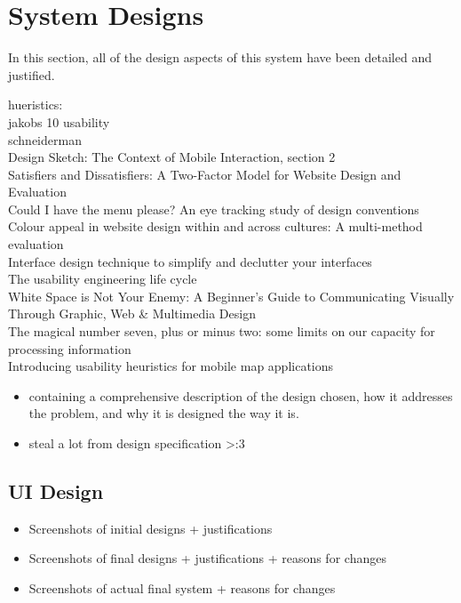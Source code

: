 \section{System Designs}
In this section, all of the design aspects of this system have been detailed and justified. 

hueristics:\ \\
jakobs 10 usability \cite{nielsen2005ten}\cite{nielsen1990heuristic}\ \\
schneiderman \cite{shneiderman2005designing}\\
Design Sketch: The Context of Mobile Interaction, section 2 \cite{savio2007design}\\
Satisfiers and Dissatisfiers: A Two-Factor Model for Website Design and Evaluation \cite{zhang2000satisfiers}\\
Could I have the menu please? An eye tracking study of design conventions \cite{mccarthy2004could}\\
Colour appeal in website design within and across cultures: A multi-method evaluation  \cite{cyr2010colour}\\
Interface design technique to simplify and declutter your interfaces \cite{depot2014clutter}\\
The usability engineering life cycle \cite{nielsen1992usability}\\
White Space is Not Your Enemy: A Beginner's Guide to Communicating Visually Through Graphic, Web \& Multimedia Design \cite{golombisky2013white}\\
The magical number seven, plus or minus two: some limits on our capacity for processing information \cite{miller1956magical}\\
Introducing usability heuristics for mobile map applications\cite{kuparinen2013introducing}

{\color{red}
	\begin{itemize}
		\item containing a comprehensive description of the design chosen, how it addresses the problem, and why it is designed the way it is.
		\item steal a lot from design specification >:3
	\end{itemize}
}


\subsection{UI Design}
{\color{red}
	\begin{itemize}
		\item Screenshots of initial designs + justifications
		\item Screenshots of final designs + justifications + reasons for changes
		\item Screenshots of actual final system + reasons for changes
	\end{itemize}
}

